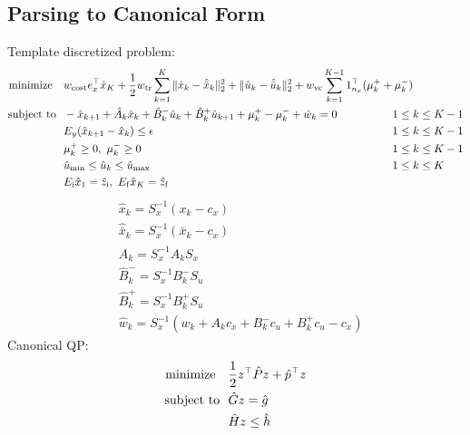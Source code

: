 \documentclass[11pt,a4paper]{article}
\begin{document}
\subsection{Parsing to Canonical Form}
%
Template discretized problem:
\begin{subequations}
\begin{align}
    \mr{minimize}~~&~w_{\mr{cost}}e_x^\top\hat{x}_K + \frac{1}{2}w_{\mr{tr}}\sum_{k=1}^K \|\hat{x}_k - \hat{\bar{x}}_k\|_2^2 + \|\hat{u}_k - \hat{\bar{u}}_k\|_2^2 + w_{\mr{vc}}\sum_{k=1}^{K-1}1_{n_x}^\top(\mu^+_k+\mu_k^-) & &  \\
    \mr{subject~to}~&~-\hat{x}_{k+1} + \hat{A}_k\hat{x}_k + \hat{B}^-_k\hat{u}_k + \hat{B}^+_k\hat{u}_{k+1} + \mu_k^+ - \mu_k^- + \hat{w}_k = 0 & & \hspace{-1cm}1 \le k \le K-1\\
     &~E_{y}(\hat{x}_{k+1}-\hat{x}_{k}) \le \epsilon & & \hspace{-1cm}1 \le k \le K-1\\
     &~\mu_k^+\ge 0,~\mu^-_k\ge 0 & &  \hspace{-1cm}1 \le k \le K-1 \\
     &~\hat{u}_{\min} \le \hat{u}_k \le \hat{u}_{\max} & &  \hspace{-1cm}1 \le k \le K\\
     &~E_{\mr{i}}\hat{x}_1 = \hat{z}_{\mr{i}},~E_{\mr{f}}\hat{x}_K = \hat{z}_{\mr{f}} 
\end{align}
\end{subequations}
%
\begin{align*}
    & \hat{x}_k = S_x^{-1}(x_k-c_x)\\
    & \hat{\bar{x}}_k = S_x^{-1}(\bar{x}_k-c_x)\\
    & \hat{A}_k = S_x^{-1}A_kS_x\\
    & \hat{B}^-_k = S_x^{-1}B^-_kS_u\\
    & \hat{B}^+_k = S_x^{-1}B^+_kS_u\\
    & \hat{w}_k = S_x^{-1}(w_k+A_kc_x+B_k^{-}c_u + B_k^{+}c_u - c_x)
\end{align*}
%
Canonical QP:
\begin{subequations}
\begin{align}
    \mathrm{minimize}~~&~\frac{1}{2}z^\top\hat{P} z + \hat{p}^\top z\\
    \mathrm{subject~to}~&~\hat{G}z = \hat{g}\\
    &~\hat{H}z\le \hat{h} 
\end{align}
\end{subequations}
\end{document}
